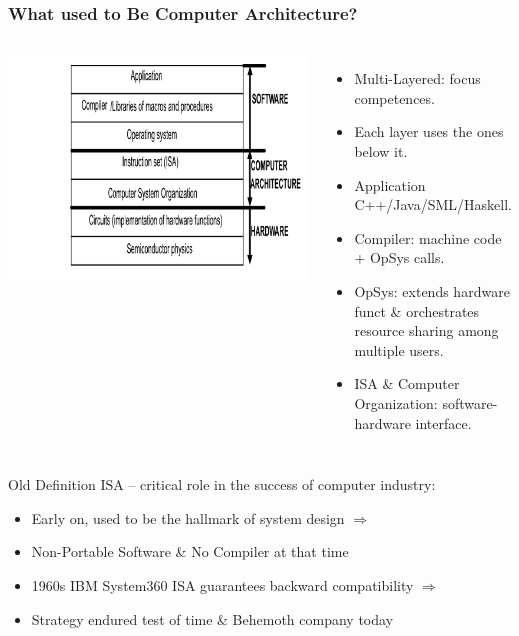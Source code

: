 \documentclass{beamer}
\newcommand{\emp}[1]{\textcolor{DikuRed}{ #1}}
\begin{document}
\begin{frame}[fragile,t]
\frametitle{What used to Be Computer Architecture?}

\begin{columns}\hspace{-8ex}
\includegraphics[width=44ex]{Figures/L1/SysOrg}
\vspace{-3ex}
\begin{itemize}
    \item Multi-Layered: focus competences.
    \item Each layer uses the ones below it.
    \item \emp{Application} C++/Java/SML/Haskell.
    \item \emp{Compiler}: machine code + OpSys calls.
    \item \emp{OpSys}: extends hardware funct \&
              orchestrates resource sharing among multiple users.
    \item \emp{ISA \& Computer Organization}: 
            software-hardware interface. 
\end{itemize}
\end{columns}

\emp{Old Definition} ISA -- critical role in the success of computer industry:
\begin{itemize}
    \item Early on, used to be the hallmark of system design $\Rightarrow$
    \item Non-Portable Software \& No Compiler at that time
    \item 1960s IBM System360 ISA guarantees backward compatibility $\Rightarrow$
    \item Strategy endured test of time \& Behemoth company today
\end{itemize}
\end{frame}
\end{document}
